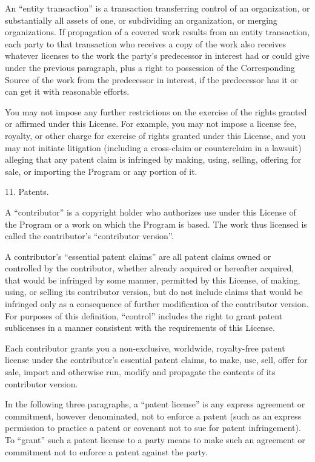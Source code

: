 \documentclass[letterpaper,12pt]{article}
\begin{document}
{An ``entity transaction'' is a transaction transferring control of an organization, or substantially all assets of one, or subdividing an organization, or merging organizations. If propagation of a covered work results from an entity transaction, each party to that transaction who receives a copy of the work also receives whatever licenses to the work the party's predecessor in interest had or could give under the previous paragraph, plus a right to possession of the Corresponding Source of the work from the predecessor in interest, if the predecessor has it or can get it with reasonable efforts.

You may not impose any further restrictions on the exercise of the rights granted or affirmed under this License. For example, you may not impose a license fee, royalty, or other charge for exercise of rights granted under this License, and you may not initiate litigation (including a cross-claim or counterclaim in a lawsuit) alleging that any patent claim is infringed by making, using, selling, offering for sale, or importing the Program or any portion of it.

11. Patents.

A ``contributor'' is a copyright holder who authorizes use under this License of the Program or a work on which the Program is based. The work thus licensed is called the contributor's ``contributor version''.

A contributor's ``essential patent claims'' are all patent claims owned or controlled by the contributor, whether already acquired or hereafter acquired, that would be infringed by some manner, permitted by this License, of making, using, or selling its contributor version, but do not include claims that would be infringed only as a consequence of further modification of the contributor version. For purposes of this definition, ``control'' includes the right to grant patent sublicenses in a manner consistent with the requirements of this License.

Each contributor grants you a non-exclusive, worldwide, royalty-free patent license under the contributor's essential patent claims, to make, use, sell, offer for sale, import and otherwise run, modify and propagate the contents of its contributor version.

In the following three paragraphs, a ``patent license'' is any express agreement or commitment, however denominated, not to enforce a patent (such as an express permission to practice a patent or covenant not to sue for patent infringement). To ``grant'' such a patent license to a party means to make such an agreement or commitment not to enforce a patent against the party.

}
\end{document}
